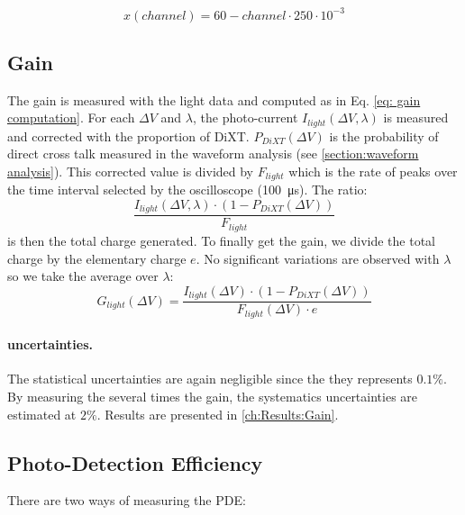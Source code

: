 \begin{equation}
    x(channel) = 60 - channel\cdot250\cdot 10^{-3}
    \label{eq:light alignement}
\end{equation}



\subsection{Gain}
\label{ch:experiement methods:Gain & PDE:gain}
The gain is measured with the light data and computed as in Eq. \eqref{eq: gain computation}. For each $\Delta V$ and $\lambda$, the photo-current $I_{light}(\Delta V, \lambda)$ is measured and corrected with the proportion of DiXT. $P_{DiXT}(\Delta V)$ is the probability of direct cross talk measured in the waveform analysis (see \ref{section:waveform analysis}). This corrected value is divided by $F_{light}$ which is the rate of peaks over the time interval selected by the oscilloscope (\SI{100}{\micro s}). The ratio: $$\frac{I_{light}(\Delta V, \lambda)\cdot(1-P_{DiXT}(\Delta V))}{F_{light}}$$ is then the total charge generated. To finally get the gain, we divide the total charge by the elementary charge $e$. No significant variations are observed with $\lambda$ so we take the average over $\lambda$: 
\begin{equation}
    G_{light}(\Delta V) = \frac{I_{light}(\Delta V)\cdot(1-P_{DiXT}(\Delta V))}{ F_{light}(\Delta V)\cdot e}
    \label{eq:gaincomputation}
\end{equation}

\paragraph{uncertainties.} The statistical uncertainties are again negligible since the they represents $0.1\%$. By measuring the several times the gain, the systematics uncertainties are estimated at $2\%$. Results are presented in \ref{ch:Results:Gain}.


\subsection{Photo-Detection Efficiency} 
\label{ch:experiement methods:Gain & PDE:PDE}

There are two ways of measuring the PDE:

